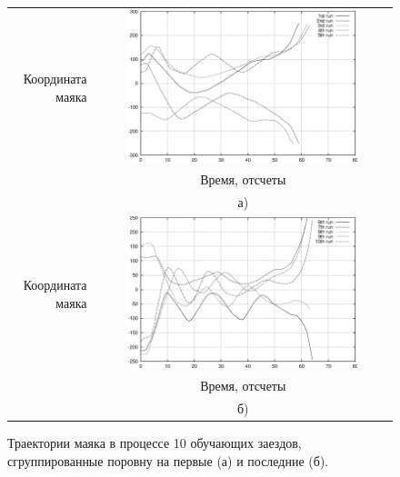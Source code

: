 \begin{figure}
\centering
  \begin{tabular}{rc}
    \begin{sideways}
      {\hspace{3cm}\small Координата маяка}
    \end{sideways}
    &
    \includegraphics[width=0.8\textwidth,%
                     totalheight=0.35\textheight]{moby_nnc_x01-05_learn}\\
    & {\small Время, отсчеты} \\
    & а) \\
    \begin{sideways}
      {\hspace{3cm}\small Координата маяка}
    \end{sideways}
    &
    \includegraphics[width=0.8\textwidth,%
                     totalheight=0.35\textheight]{moby_nnc_x06-10_learn}\\
    & {\small Время, отсчеты} \\
    & б) \\
\end{tabular}
\caption{Траектории маяка в процессе 10 обучающих заездов, сгруппированные
поровну на первые (а) и последние (б).}
\label{fig:moby_nnc_x01-10_learn}
\end{figure}

